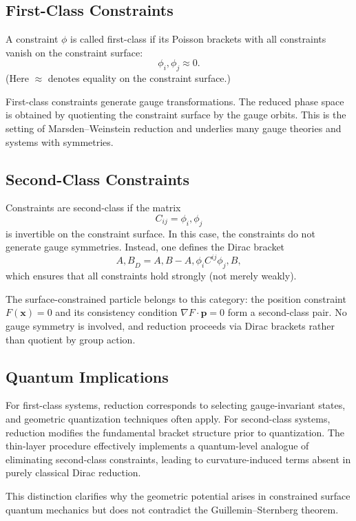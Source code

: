 \documentclass[11pt]{article}
\begin{document}
\subsection*{First-Class Constraints}

A constraint $\phi$ is called first-class if its Poisson brackets with all constraints vanish on the constraint surface:
\begin{equation}
{\phi_i,\phi_j} \approx 0.
\end{equation}
(Here $\approx$ denotes equality on the constraint surface.)

First-class constraints generate gauge transformations. The reduced phase space is obtained by quotienting the constraint surface by the gauge orbits. This is the setting of Marsden--Weinstein reduction and underlies many gauge theories and systems with symmetries.

\subsection*{Second-Class Constraints}

Constraints are second-class if the matrix
\begin{equation}
C_{ij} = {\phi_i,\phi_j}
\end{equation}
is invertible on the constraint surface. In this case, the constraints do not generate gauge symmetries. Instead, one defines the Dirac bracket
\begin{equation}
{A,B}_D = {A,B} - {A,\phi_i}C^{ij}{\phi_j,B},
\end{equation}
which ensures that all constraints hold strongly (not merely weakly).

The surface-constrained particle belongs to this category: the position constraint $F(\mathbf{x})=0$ and its consistency condition $\nabla F \cdot \mathbf{p}=0$ form a second-class pair. No gauge symmetry is involved, and reduction proceeds via Dirac brackets rather than quotient by group action.

\subsection*{Quantum Implications}

For first-class systems, reduction corresponds to selecting gauge-invariant states, and geometric quantization techniques often apply. For second-class systems, reduction modifies the fundamental bracket structure prior to quantization. The thin-layer procedure effectively implements a quantum-level analogue of eliminating second-class constraints, leading to curvature-induced terms absent in purely classical Dirac reduction.

This distinction clarifies why the geometric potential arises in constrained surface quantum mechanics but does not contradict the Guillemin--Sternberg theorem.
\end{document}
